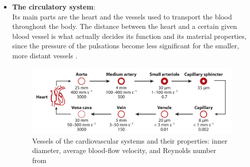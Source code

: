 \begin{itemize}
\item \textbf{The circulatory system}: \\
Its main parts are the heart and the vessels used to transport the blood throughout the body. The distance between the heart and a certain given blood vessel is what actually decides its function and its material properties, since the pressure of the pulsations become less significant for the smaller, more distant vessels \cite{Nelson2010}.

\begin{figure}[ht]
	\centering
  \includegraphics[width=1\textwidth]{Pictures/Bloodvessels.png}
	\caption{Vessels of the cardiovascular systems and their properties: inner diameter, average blood-flow velocity, and Reynolds number from \cite{berger1996}}
	\label{fig:veins}
\end{figure}


\end{itemize}
